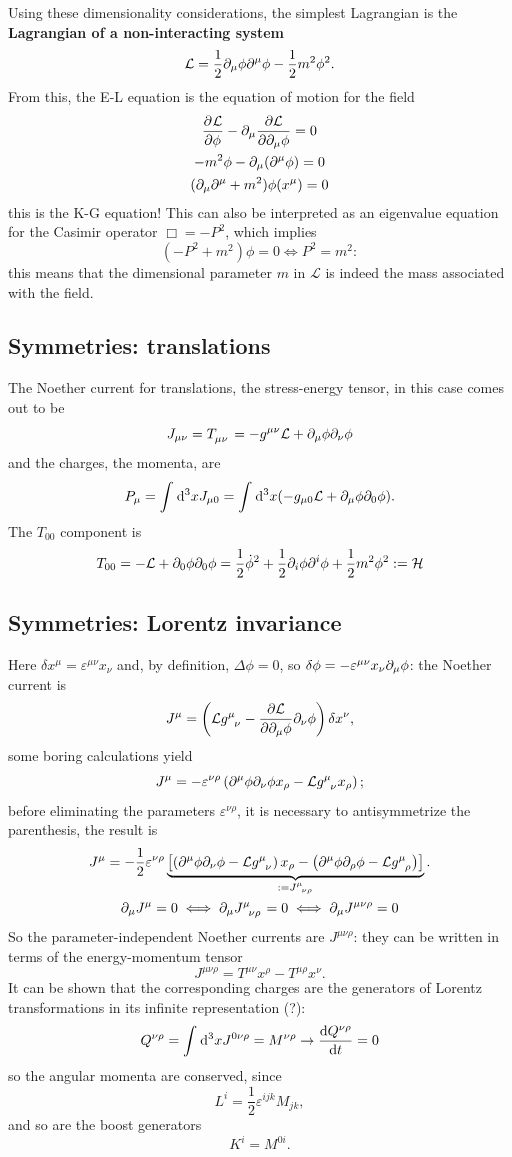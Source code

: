 Using these dimensionality considerations, the simplest Lagrangian is the \textbf{
Lagrangian of a non-interacting system}
$$\mathcal{L} = \frac{1}{2}\partial_\mu\phi\partial^\mu\phi - \frac{1}{2}m^2\phi^2.$$
From this, the E-L equation is the equation of motion for the field
\begin{gather*}
\pdv[]{\mathcal{L}}{\phi}-\partial_\mu\pdv{\mathcal{L}}{\partial_\mu\phi}=0\\
-m^2\phi-\partial_\mu(\partial^\mu\phi) = 0\\
(\partial_\mu\partial^\mu + m^2)\phi(x^\mu)=0
\end{gather*}
this is the K-G equation! This can also be interpreted as an eigenvalue equation for
the Casimir operator $\Box=-P^2$, which implies
$$(-P^2+m^2)\phi=0\iff P^2=m^2:$$
this means that the dimensional parameter $m$ in $\mathcal{L}$ is indeed the mass
associated with the field.
\subsection{Symmetries: translations}
The Noether current for translations, the stress-energy tensor, in this case comes
out to be
$$J_{\mu\nu}=T\indices{_\mu_\nu} = -g^{\mu\nu}\mathcal{L}+ \pd_\mu\phi\pd_\nu\phi$$
and the charges, the momenta, are
$$P_\mu = \int_{}^{}\dd^3x J_{\mu0} = \int_{}^{}\dd^3x (-g_{\mu0}\mathcal{L} +
\partial_\mu\phi\partial_0\phi).$$
The $T_{00}$ component is
$$T_{00}=-\mathcal{L} + \partial_0\phi\partial_0\phi = \frac{1}{2}\dot\phi^2 + \frac{1}{2}\partial_i
\phi\partial^i\phi+\frac{1}{2}m^2\phi^2 := \mathcal{H}$$
\subsection{Symmetries: Lorentz invariance}
Here $\delta x^\mu = \varepsilon^{\mu\nu}x_\nu$ and, by definition,
$\Delta\phi=0$, so $\delta\phi = -\varepsilon^{\mu\nu}x_\nu\partial_\mu\phi$:
the Noether current is
$$J^\mu = \left(\mathcal{L}g\indices{^\mu_\nu}-\pdv{\mathcal{L}}{\pd_\mu\phi}
\pd_\nu\phi\right)\delta x^\nu,$$   
some boring calculations yield
$$J^\mu = -\varepsilon^{\nu\rho}\left(\pd^\mu\phi\pd_\nu\phi x_\rho-\mathcal{L}
g\indices{^\mu_\nu}x_\rho\right);$$
before eliminating the parameters $\varepsilon^{\nu\rho}$, it is necessary to
antisymmetrize the parenthesis, the result is
\begin{gather*}
    J^\mu = -\frac{1}{2}\varepsilon^{\nu\rho}\underbrace{
    \left[\left(\pd^\mu\phi\pd_\nu\phi-\mathcal{L}g\indices{^\mu_\nu}\right)x_\rho -
    \left(\pd^\mu\phi\pd_\rho\phi-\mathcal{L}g\indices{^\mu_\rho}\right)\right]}_
    {:=J\indices{^\mu_\nu_\rho}}.\\
    \pd_\mu J^\mu = 0 \iff \pd_\mu J\indices{^\mu_\nu_\rho}=0
    \iff \pd_\mu J^{\mu\nu\rho}=0
\end{gather*}
So the parameter-independent Noether currents are $J^{\mu\nu\rho}$: they can be
written in terms of the energy-momentum tensor
$$J^{\mu\nu\rho}=T^{\mu\nu}x^\rho - T^{\mu\rho}x^\nu.$$
It can be shown that the corresponding charges are the generators of
Lorentz transformations in its infinite representation (?):
$$Q^{\nu\rho}=\int_{}^{}\dd^3 x J^{0\nu\rho} = M^{\nu\rho}\rightarrow
\dv{Q^{\nu\rho}}{t} = 0$$
so the angular momenta are conserved, since
$$L^i = \frac{1}{2}\varepsilon^{ijk}M_{jk},$$
and so are the boost generators
$$K^i = M^{0i}.$$
